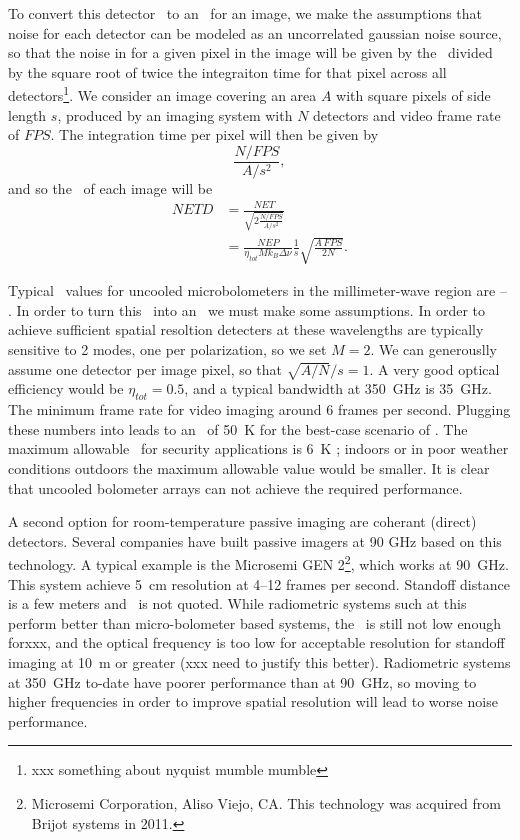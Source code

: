 To convert this detector \NET\ to an \NETD\ for an image, we make the assumptions that noise for each detector can be modeled as an uncorrelated gaussian noise source, so that the noise in for a given pixel in the image will be given by the \NET\ divided by the square root of twice the integraiton time for that pixel across all detectors\footnote{%
  xxx something about nyquist mumble mumble
}. 
We consider an image covering an area $A$ with square pixels of side length $s$, produced by an imaging system with $N$ detectors and video frame rate of $FPS$.
The integration time per pixel will then be given by
\begin{equation}
  \frac{N / FPS}{A / s^2},
\end{equation}
and so the \NETD\ of each image will be
\begin{align}
  NETD & = \frac{NET}{\sqrt{ 2 \frac{N / FPS}{A / s^2}}} \\
       & = \frac{NEP}{\eta_{tot} M k_B \Delta \nu} \frac{1}{s} \sqrt{\frac{A\,FPS}{2 N}} .
       \label{eqn:ch1-netd-defn}
\end{align}

Typical \NEP\ values for uncooled microbolometers in the millimeter-wave region are -- \cite{that military report}.
In order to turn this \NEP\ into an \NETD\ we must make some assumptions.
In order to achieve sufficient spatial resoltion detecters at these wavelengths are typically sensitive to 2 modes, one per polarization, so we set $M = 2$.
We can generouslly assume one detector per image pixel, so that $\sqrt{A/N}/s = 1$.
A very good optical efficiency would be $\eta_{tot} = 0.5$, and a typical bandwidth at \SI{350}{\GHz} is \SI{35}{\GHz}.
The minimum frame rate for video imaging around 6 frames per second.
Plugging these numbers into  leads to an \NETD\ of \SI{50}{\K} for the best-case scenario of  \NEP.
The maximum allowable \NETD\ for security applications is \SI{6}{\K} \cite{military}; indoors or in poor weather conditions outdoors the maximum allowable value would be smaller.
It is clear that uncooled bolometer arrays can not achieve the required performance.

A second option for room-temperature passive imaging are coherant (direct) detectors. 
Several companies have built passive imagers at 90 GHz based on this technology.
A typical example is the Microsemi GEN 2\footnote{%
Microsemi Corporation, Aliso Viejo, CA. This technology was acquired from Brijot systems in 2011.}, which works at \SI{90}{\GHz}.
This system achieve \SI{5}{\cm} resolution at 4--12 frames per second.
Standoff distance is a few meters and \NETD\ is not quoted.
While radiometric systems such at this perform better than micro-bolometer based systems, the \NETD\ is still not low enough forxxx, and the optical frequency is too low for acceptable resolution for standoff imaging at \SI{10}{\m} or greater (xxx need to justify this better).
Radiometric systems at \SI{350}{\GHz} to-date have poorer performance than at \SI{90}{\GHz}, so moving to higher frequencies in order to improve spatial resolution will lead to worse noise performance.

